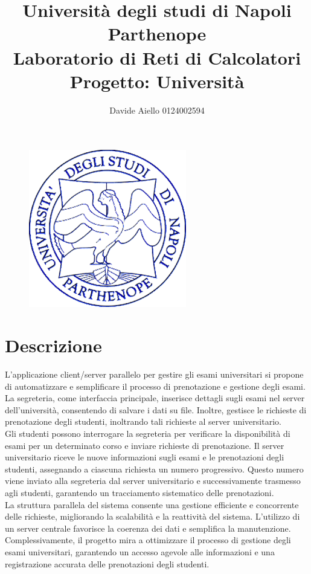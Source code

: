 \documentclass{article}
\title{
\textbf{Università degli studi di Napoli Parthenope\\
Laboratorio di Reti di Calcolatori\\
Progetto: \textbf{Università}}
}
\author {Davide Aiello 0124002594}
\date{}
\begin{document}
\begin{figure}[htp]
    \centering
    \includegraphics[width=0.5\linewidth]{logo_uni.png}
    \maketitle
\end{figure}
\newpage
\section{Descrizione}


L'applicazione client/server parallelo per gestire gli esami universitari si propone di automatizzare e semplificare il processo di prenotazione e gestione degli esami. La segreteria, come interfaccia principale, inserisce dettagli sugli esami nel server dell'università, consentendo di salvare i dati su file. Inoltre, gestisce le richieste di prenotazione degli studenti, inoltrando tali richieste al server universitario.\\

Gli studenti possono interrogare la segreteria per verificare la disponibilità di esami per un determinato corso e inviare richieste di prenotazione. Il server universitario riceve le nuove informazioni sugli esami e le prenotazioni degli studenti, assegnando a ciascuna richiesta un numero progressivo. Questo numero viene inviato alla segreteria dal server universitario e successivamente trasmesso agli studenti, garantendo un tracciamento sistematico delle prenotazioni.\\

La struttura parallela del sistema consente una gestione efficiente e concorrente delle richieste, migliorando la scalabilità e la reattività del sistema. L'utilizzo di un server centrale favorisce la coerenza dei dati e semplifica la manutenzione. Complessivamente, il progetto mira a ottimizzare il processo di gestione degli esami universitari, garantendo un accesso agevole alle informazioni e una registrazione accurata delle prenotazioni degli studenti.
\end{document}
